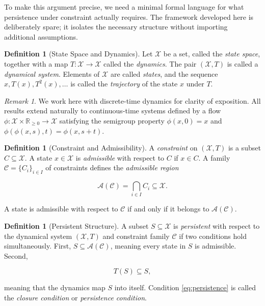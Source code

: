 \documentclass[12pt, a4paper, oneside]{article}
\theoremstyle{plain}
\theoremstyle{definition}
\newtheorem{definition}[theorem]{Definition}
\theoremstyle{remark}
\newtheorem{remark}[theorem]{Remark}
\newcommand{\X}{\mathcal{X}}
\newcommand{\C}{\mathcal{C}}
\newcommand{\A}{\mathcal{A}}
\newcommand{\T}{T}
\begin{document}
To make this argument precise, we need a minimal formal language for what persistence under constraint actually requires. The framework developed here is deliberately spare; it isolates the necessary structure without importing additional assumptions.

\begin{definition}[State Space and Dynamics]
Let $\X$ be a set, called the \emph{state space}, together with a map $\T : \X \to \X$ called the \emph{dynamics}. The pair $(\X, \T)$ is called a \emph{dynamical system}. Elements of $\X$ are called \emph{states}, and the sequence $x, \T(x), \T^2(x), \ldots$ is called the \emph{trajectory} of the state $x$ under $\T$.
\end{definition}

\begin{remark}
We work here with discrete-time dynamics for clarity of exposition. All results extend naturally to continuous-time systems defined by a flow $\phi : \X \times \mathbb{R}_{\geq 0} \to \X$ satisfying the semigroup property $\phi(x, 0) = x$ and $\phi(\phi(x, s), t) = \phi(x, s+t)$.
\end{remark}

\begin{definition}[Constraint and Admissibility]
A \emph{constraint} on $(\X, \T)$ is a subset $C \subseteq \X$. A state $x \in \X$ is \emph{admissible} with respect to $C$ if $x \in C$. A family $\C = \{C_i\}_{i \in I}$ of constraints defines the \emph{admissible region}

\begin{equation}
\A(\C) = \bigcap_{i \in I} C_i \subseteq \X.
\end{equation}

A state is admissible with respect to $\C$ if and only if it belongs to $\A(\C)$.
\end{definition}

\begin{definition}[Persistent Structure]
A subset $S \subseteq \X$ is \emph{persistent} with respect to the dynamical system $(\X, \T)$ and constraint family $\C$ if two conditions hold simultaneously. First, $S \subseteq \A(\C)$, meaning every state in $S$ is admissible. Second,

\begin{equation}
\T(S) \subseteq S,
\label{eq:persistence}
\end{equation}

meaning that the dynamics map $S$ into itself. Condition \eqref{eq:persistence} is called the \emph{closure condition} or \emph{persistence condition}.
\end{definition}
\end{document}
